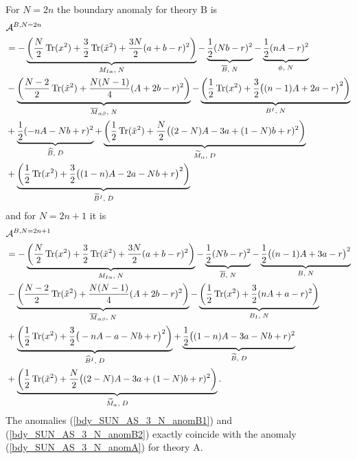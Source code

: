\documentclass[12pt]{article}
\newcommand{\Acal}{\mathcal{A}}
\DeclareMathOperator*{\Tr}{{\rm Tr}}
\numberwithin{equation}{section}
\begin{document}
For $N=2n$ the boundary anomaly for theory B is 
\begin{align}
\label{bdy_SUN_AS_3_N_anomB1}
&
\Acal^{B, N=2n} 
\nonumber\\
&=  - \underbrace{\left( \frac{N}{2} \Tr(x^2) + \frac{3}{2} \Tr(\tilde{x}^2) + \frac{3N}{2}(a+b-r)^2 \right)}_{M_{I \alpha}, \; N}
  - \underbrace{\frac{1}{2}(Nb-r)^2}_{\overline{B}, \; N}
  - \underbrace{\frac{1}{2}(nA-r)^2}_{\phi, \; N}
  \nonumber \\
 & - \underbrace{\left( \frac{N-2}{2} \Tr(\tilde{x}^2) + \frac{N(N-1)}{4}(A + 2b - r)^2 \right)}_{\overline{M}_{\alpha \beta}, \; N}
  - \underbrace{\left( \frac{1}{2} \Tr(x^2) + \frac{3}{2}\big( (n-1)A + 2a-r \big)^2 \right)}_{B^I, \; N}
   \nonumber \\
 & + \underbrace{\frac{1}{2}(-nA - Nb + r)^2}_{\widehat{B}, \; D}
 + \underbrace{\left( \frac{1}{2} \Tr(\tilde{x}^2) + \frac{N}{2}\big( (2-N)A - 3a +(1-N)b + r)^2 \right)}_{\widetilde{M}_{\alpha}, \; D}
  \nonumber \\
  & + \underbrace{\left( \frac{1}{2} \Tr(x^2) + \frac{3}{2}\big( (1-n)A - 2a - Nb + r \big)^2 \right)}_{\widetilde{B}^I, \; D}
\end{align}
and for $N=2n+1$ it is
\begin{align}
\label{bdy_SUN_AS_3_N_anomB2}
&\Acal^{B, N=2n+1} 
\nonumber\\
&= - \underbrace{\left( \frac{N}{2} \Tr(x^2) + \frac{3}{2} \Tr(\tilde{x}^2) + \frac{3N}{2}(a+b-r)^2 \right)}_{M_{I \alpha}, \; N}
  - \underbrace{\frac{1}{2}(Nb-r)^2}_{\overline{B}, \; N}
  - \underbrace{\frac{1}{2} \big( (n-1)A + 3a - r \big)^2}_{B, \; N}
  \nonumber \\
 & - \underbrace{\left( \frac{N-2}{2} \Tr(\tilde{x}^2) + \frac{N(N-1)}{4}(A + 2b - r)^2 \right)}_{\overline{M}_{\alpha \beta}, \; N}
  - \underbrace{\left( \frac{1}{2} \Tr(x^2) + \frac{3}{2}(nA + a-r)^2 \right)}_{B_I, \; N}
   \nonumber \\
 & + \underbrace{\left( \frac{1}{2} \Tr(x^2) + \frac{3}{2}\big( -nA - a - Nb + r \big)^2 \right)}_{\widehat{B}^I, \; D}
 + \underbrace{\frac{1}{2}\big( (1-n)A - 3a - Nb + r)^2}_{\widetilde{B}, \; D}
  \nonumber \\
 & + \underbrace{\left( \frac{1}{2} \Tr(\tilde{x}^2) + \frac{N}{2}\big( (2-N)A - 3a +(1-N)b + r)^2 \right)}_{\widetilde{M}_{\alpha}, \; D}. 
\end{align}
The anomalies (\ref{bdy_SUN_AS_3_N_anomB1}) and (\ref{bdy_SUN_AS_3_N_anomB2}) exactly coincide with the anomaly (\ref{bdy_SUN_AS_3_N_anomA}) for theory A. 
\end{document}
